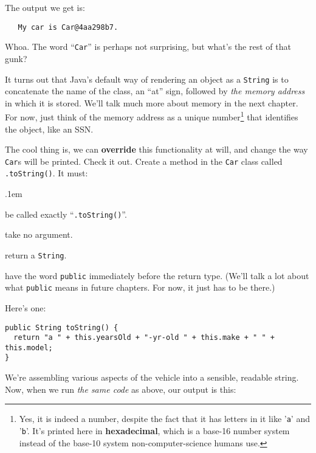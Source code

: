 The output we get is:

\begin{verbatim}
   My car is Car@4aa298b7.
\end{verbatim}

Whoa. The word ``\texttt{Car}'' is perhaps not surprising, but what's the rest
of that gunk?

It turns out that Java's default way of rendering an object as a
\texttt{String} is to concatenate the name of the class, an ``at'' sign,
followed by \textit{the memory address} in which it is stored. We'll talk much
more about memory in the next chapter. For now, just think of the memory
address as a unique number\footnote{Yes, it is indeed a number, despite the
fact that it has letters in it like '\texttt{a}' and '\texttt{b}'. It's
printed here in \textbf{hexadecimal}, which is a base-16 number system instead
of the base-10 system non-computer-science humans use.} that identifies the
object, like an SSN.

\begin{samepage}
\label{pg:toString}
The cool thing is, we can \textbf{override} this functionality at will, and
change the way \texttt{Car}s will be printed. Check it out. Create a method in
the \texttt{Car} class called \texttt{.toString()}. It must:

\begin{compactenum}
\itemsep.1em
\item be called exactly ``\texttt{.toString()}''.
\item take no argument.
\item return a \texttt{String}.
\item have the word \texttt{public} immediately before the return type. (We'll
talk a lot about what \texttt{public} means in future chapters. For now, it just has to
be there.)
\end{compactenum}
\end{samepage}

Here's one:

\begin{Verbatim}[samepage=true,fontsize=\scriptsize,frame=single]
public String toString() {
  return "a " + this.yearsOld + "-yr-old " + this.make + " " + this.model;
}
\end{Verbatim}

We're assembling various aspects of the vehicle into a sensible, readable
string. Now, when we run \textit{the same code} as above, our output is this:

